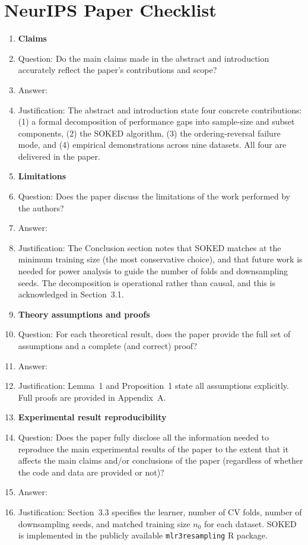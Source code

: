 \section*{NeurIPS Paper Checklist}

\begin{enumerate}

\item {\bf Claims}
    \item[] Question: Do the main claims made in the abstract and introduction accurately reflect the paper's contributions and scope?
    \item[] Answer: \answerYes{}
    \item[] Justification: The abstract and introduction state four concrete contributions: (1) a formal decomposition of performance gaps into sample-size and subset components, (2) the SOKED algorithm, (3) the ordering-reversal failure mode, and (4) empirical demonstrations across nine datasets. All four are delivered in the paper.

\item {\bf Limitations}
    \item[] Question: Does the paper discuss the limitations of the work performed by the authors?
    \item[] Answer: \answerYes{}
    \item[] Justification: The Conclusion section notes that SOKED matches at the minimum training size (the most conservative choice), and that future work is needed for power analysis to guide the number of folds and downsampling seeds. The decomposition is operational rather than causal, and this is acknowledged in Section~3.1.

\item {\bf Theory assumptions and proofs}
    \item[] Question: For each theoretical result, does the paper provide the full set of assumptions and a complete (and correct) proof?
    \item[] Answer: \answerYes{}
    \item[] Justification: Lemma~1 and Proposition~1 state all assumptions explicitly. Full proofs are provided in Appendix~A.

\item {\bf Experimental result reproducibility}
    \item[] Question: Does the paper fully disclose all the information needed to reproduce the main experimental results of the paper to the extent that it affects the main claims and/or conclusions of the paper (regardless of whether the code and data are provided or not)?
    \item[] Answer: \answerYes{}
    \item[] Justification: Section~3.3 specifies the learner, number of CV folds, number of downsampling seeds, and matched training size $n_0$ for each dataset. SOKED is implemented in the publicly available \texttt{mlr3resampling} R package.


\end{enumerate}
